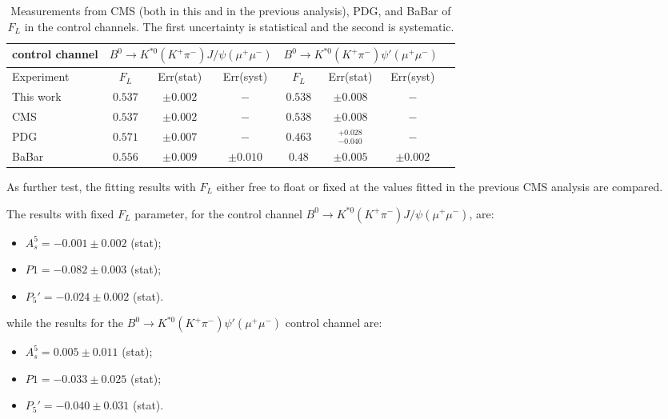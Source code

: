 \begin{table*}[!htb]
  \begin {center}
    \begin{small}
      \caption{Measurements from CMS (both in this and in the previous analysis), PDG, and BaBar\cite{BaBar2} of $F_L$ in the control channels.
        The first uncertainty is statistical and the second is systematic.
        \label{tab:com.control channel}}
      \begin{tabular}{l|c|c|c|c|c|c|c}
        control channel & \multicolumn{3}{|c|}{$B^0 \rightarrow K^{*0}(K^+\pi^-) J/\psi(\mu^+ \mu^-)$} & \multicolumn{3}{|c|}{$B^0 \rightarrow K^{*0}(K^+\pi^-) \psi'(\mu^+ \mu^-)$}\\
        \hline
        Experiment  & $F_L$  &  Err(stat) & Err(syst) & $F_L$  &  Err(stat) & Err(syst)\\
        \hline
        This work & $0.537$ & $\pm0.002$ &  $-$  & $0.538$ & $\pm0.008$ &  $-$\\
        \hline
        CMS   &  $0.537$ & $\pm0.002$ &  $-$    &  $0.538$ & $\pm0.008$ &  $-$  \\
        \hline
        PDG   &  $0.571$ & $\pm0.007$ & $-$      &  $0.463$ & $^{+0.028}_{-0.040} $ & $-$ \\
        \hline
        BaBar &  $0.556$ & $\pm0.009$ & $\pm0.010 $   &  $0.48$ & $\pm0.005$ & $\pm0.002 $\\
      \end{tabular}
    \end{small}
  \end{center}
\end{table*}

As further test, the fitting results with $F_L$ either free to float or fixed at the values fitted in the previous CMS analysis are compared.

The results with fixed $F_L$ parameter, for the control channel $B^0 \rightarrow K^{*0}(K^+\pi^-) J/\psi(\mu^+ \mu^-)$, are:
\begin{itemize}
\item $A_s^5 = -0.001 \pm 0.002$ (stat);
\item $P1 = -0.082 \pm 0.003$ (stat);
\item $P_5' = -0.024 \pm 0.002$ (stat).
\end{itemize}
while the results for the $B^0 \rightarrow K^{*0}(K^+\pi^-) \psi'(\mu^+ \mu^-)$ control channel are:
\begin{itemize}
\item $A_s^5 = 0.005 \pm 0.011$ (stat);
\item $P1 = -0.033 \pm 0.025$ (stat);
\item $P_5' = -0.040 \pm 0.031$ (stat).
\end{itemize}

